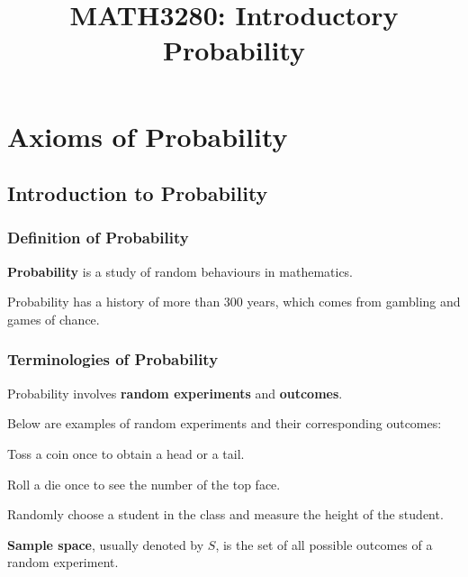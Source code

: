 \documentclass[a4paper,12pt]{article}
\begin{document}
\title{MATH3280: Introductory Probability}


\remark{}



\section{Axioms of Probability}
\subsection{Introduction to Probability}
\subsubsection{Definition of Probability}
\begin{dft}
  \textbf{Probability} is a study of random behaviours in mathematics.
\end{dft}\n

Probability has a history of more than $300$ years, which comes from gambling and games of chance.

\subsubsection{Terminologies of Probability}
Probability involves \textbf{random experiments} and \textbf{outcomes}.\n

\begin{exm}
  Below are examples of random experiments and their corresponding outcomes:
  
  \begin{alist}
    \item Toss a coin once to obtain a head or a tail.
    \item Roll a die once to see the number of the top face.
    \item Randomly choose a student in the class and measure the height of the student.
  \end{alist}
\end{exm}\n

\begin{dft}
  \textbf{Sample space}, usually denoted by $S$, is the set of all possible outcomes of a random experiment.
\end{dft}\n
\end{document}
